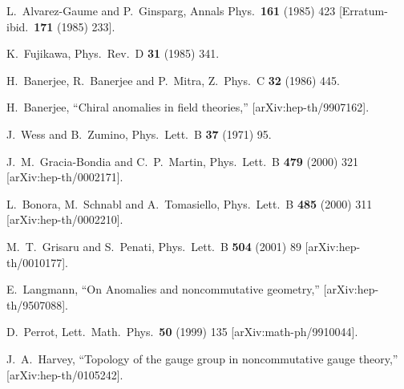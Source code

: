 \documentclass[a4paper,12pt]{article}
\begin{document}
\begin{thebibliography}{99}
L.~Alvarez-Gaume and P.~Ginsparg,
Annals Phys.\  {\bf 161} (1985) 423
[Erratum-ibid.\  {\bf 171} (1985) 233].

K.~Fujikawa,
Phys.\ Rev.\ D {\bf 31} (1985) 341.

H.~Banerjee, R.~Banerjee and P.~Mitra,
Z.\ Phys.\ C {\bf 32} (1986) 445.

H.~Banerjee,
``Chiral anomalies in field theories,''
[arXiv:hep-th/9907162].

J.~Wess and B.~Zumino,
Phys.\ Lett.\ B {\bf 37} (1971) 95.


J.~M.~Gracia-Bondia and C.~P.~Martin,
Phys.\ Lett.\ B {\bf 479} (2000) 321
[arXiv:hep-th/0002171].

L.~Bonora, M.~Schnabl and A.~Tomasiello,
Phys.\ Lett.\ B {\bf 485} (2000) 311
[arXiv:hep-th/0002210].

M.~T.~Grisaru and S.~Penati,
Phys.\ Lett.\ B {\bf 504} (2001) 89
[arXiv:hep-th/0010177].

E.~Langmann,
``On Anomalies and noncommutative geometry,''
[arXiv:hep-th/9507088].

D.~Perrot,
Lett.\ Math.\ Phys.\  {\bf 50} (1999) 135
[arXiv:math-ph/9910044].

J.~A.~Harvey,
``Topology of the gauge group in noncommutative gauge theory,''
[arXiv:hep-th/0105242].


\end{thebibliography}
\end{document}
